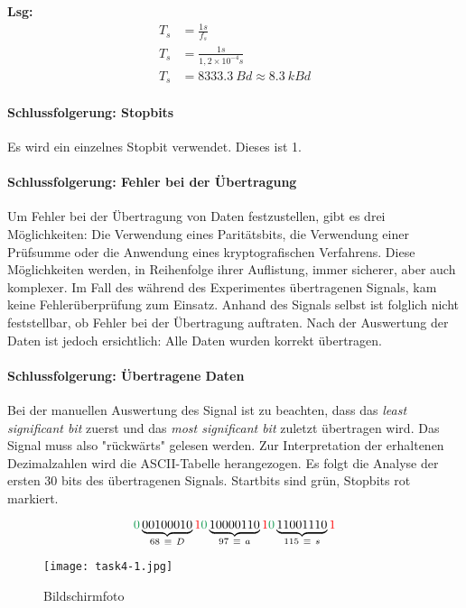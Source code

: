 \vspace{0.25cm}

\noindent
\textbf{Lsg:}
\begin{align*}
	T_s &= \frac{1s}{f_s} \\
	T_s &= \frac{1s}{1,2 \times 10^{-4}s} \\
	T_s &= \SI{8333,3}{Bd} \approx \SI{8,3}{kBd}
\end{align*}

\paragraph{Schlussfolgerung: Stopbits}
Es wird ein einzelnes Stopbit verwendet. Dieses ist 1.

\paragraph{Schlussfolgerung: Fehler bei der Übertragung}
Um Fehler bei der Übertragung von Daten festzustellen, gibt es drei Möglichkeiten: Die Verwendung eines Paritätsbits, die Verwendung einer Prüfsumme oder die Anwendung eines kryptografischen Verfahrens. Diese Möglichkeiten werden, in Reihenfolge ihrer Auflistung, immer sicherer, aber auch komplexer. Im Fall des während des Experimentes übertragenen Signals, kam keine Fehlerüberprüfung zum Einsatz. Anhand des Signals selbst ist folglich nicht feststellbar, ob Fehler bei der Übertragung auftraten. Nach der Auswertung der Daten ist jedoch ersichtlich: Alle Daten wurden korrekt übertragen.

\paragraph{Schlussfolgerung: Übertragene Daten}
Bei der manuellen Auswertung des Signal ist zu beachten, dass das \textit{least significant bit} zuerst und das \textit{most significant bit} zuletzt übertragen wird. Das Signal muss also "rückwärts" gelesen werden. Zur Interpretation der erhaltenen Dezimalzahlen wird die ASCII-Tabelle herangezogen. Es folgt die Analyse der ersten 30 bits des übertragenen Signals. Startbits sind grün, Stopbits rot markiert.

$$
	\textcolor{ForestGreen}{0}\underbrace{00100010}_{68 \ \equiv \ D}\textcolor{red}{1}
	\textcolor{ForestGreen}{0}\underbrace{10000110}_{97 \ \equiv \ a}\textcolor{red}{1}
	\textcolor{ForestGreen}{0}\underbrace{11001110}_{115 \ \equiv \ s}\textcolor{red}{1}
$$

\begin{figure}[!h]
	\centering
	\texttt{[image: task4-1.jpg]}
	\caption{Bildschirmfoto}
	\label{task4-1}
\end{figure}

